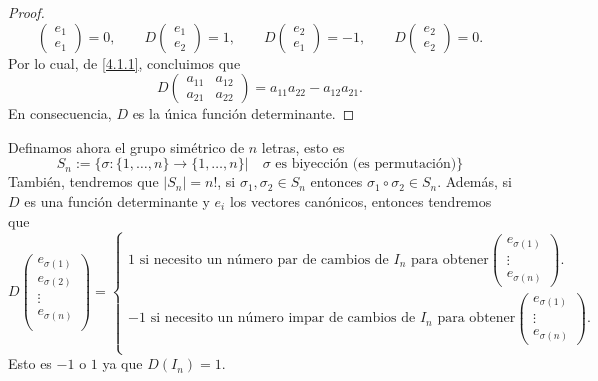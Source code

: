\documentclass[12pt,a4paper]{book}
\newcommand{\llaves}[1]{\{#1\}}
\begin{document}
\begin{proof}
\[\begin{pmatrix}
            e_1\\e_1
        \end{pmatrix} = 0, \qquad D\begin{pmatrix}
            e_1 \\ e_2
        \end{pmatrix} = 1, \qquad D\begin{pmatrix}
            e_2\\e_1
        \end{pmatrix} = - 1, \qquad D\begin{pmatrix}
            e_2 \\ e_2
        \end{pmatrix} = 0.
        \]
        Por lo cual, de \eqref{4.1.1}, concluimos que
        \[
        D \begin{pmatrix}
            a_{11} & a_{12}\\
            a_{21} & a_{22}
        \end{pmatrix} = a_{11}a_{22} - a_{12}a_{21}.
        \]
        En consecuencia, $D$ es la única función determinante.
    \end{proof}

    \begin{definicion}
        Definamos ahora el grupo simétrico de $n$ letras, esto es
        \[
        S_n := \llaves{\sigma: \llaves{1, \dots, n} \to \llaves{1, \dots, n} | \quad \sigma \text{ es biyección (es permutación)}}
        \]
        También, tendremos que $|S_n| = n!$, si $\sigma_1, \sigma_2 \in S_n$ entonces $\sigma_1 \circ \sigma_2 \in S_n$. Además, si $D$ es una función determinante y $e_i$ los vectores canónicos, entonces tendremos que
        \[
        D \begin{pmatrix}
            e_{\sigma(1)}\\
            e_{\sigma(2)}\\
            \vdots\\
            e_{\sigma(n)}\\
        \end{pmatrix} = \begin{cases}
            1 \text{ si necesito un número par de cambios de $I_n$ para obtener} \begin{pmatrix}
                e_{\sigma(1)}\\
                \vdots\\
                e_{\sigma(n)}
            \end{pmatrix}.\\
            - 1 \text{ si necesito un número impar de cambios de $I_n$ para obtener} \begin{pmatrix}
                e_{\sigma(1)}\\
                \vdots\\
                e_{\sigma(n)}
            \end{pmatrix}.\\
        \end{cases}
        \]
        Esto es $-1$ o $1$ ya que $D(I_n) = 1$.
    \end{definicion}
\end{document}
